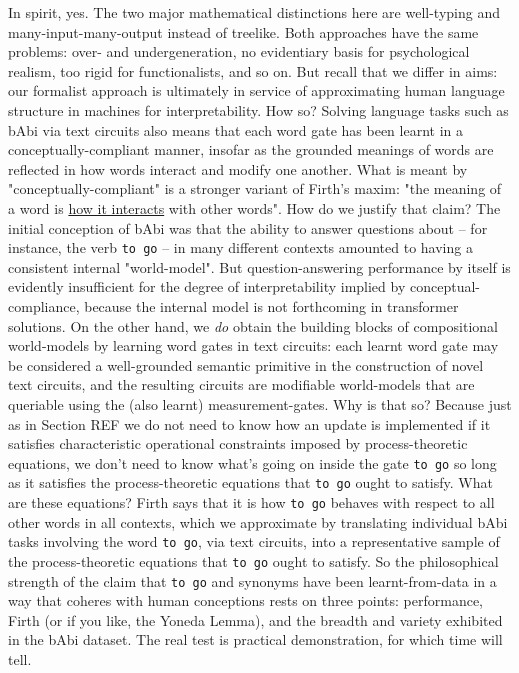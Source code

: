  In spirit, yes. The two major mathematical distinctions here are well-typing and many-input-many-output instead of treelike. Both approaches have the same problems: over- and undergeneration, no evidentiary basis for psychological realism, too rigid for functionalists, and so on. But recall that we differ in aims: our formalist approach is ultimately in service of approximating human language structure in machines for interpretability. How so? Solving language tasks such as bAbi via text circuits also means that each word gate has been learnt in a conceptually-compliant manner, insofar as the grounded meanings of words are reflected in how words interact and modify one another. What is meant by "conceptually-compliant" is a stronger variant of Firth's maxim: "the meaning of a word is \underline{how it interacts} with other words". How do we justify that claim? The initial conception of bAbi was that the ability to answer questions about -- for instance, the verb \texttt{to go} -- in many different contexts amounted to having a consistent internal "world-model". But question-answering performance by itself is evidently insufficient for the degree of interpretability implied by conceptual-compliance, because the internal model is not forthcoming in transformer solutions. On the other hand, we \emph{do} obtain the building blocks of compositional world-models by learning word gates in text circuits: each learnt word gate may be considered a well-grounded semantic primitive in the construction of novel text circuits, and the resulting circuits are modifiable world-models that are queriable using the (also learnt) measurement-gates. Why is that so? Because just as in Section \bR REF \e we do not need to know how an update is implemented if it satisfies characteristic operational constraints imposed by process-theoretic equations, we don't need to know what's going on inside the gate \texttt{to go} so long as it satisfies the process-theoretic equations that \texttt{to go} ought to satisfy. What are these equations? Firth says that it is how \texttt{to go} behaves with respect to all other words in all contexts, which we approximate by translating individual bAbi tasks involving the word \texttt{to go}, via text circuits, into a representative sample of the process-theoretic equations that \texttt{to go} ought to satisfy. So the philosophical strength of the claim that \texttt{to go} and synonyms have been learnt-from-data in a way that coheres with human conceptions rests on three points: performance, Firth (or if you like, the Yoneda Lemma), and the breadth and variety exhibited in the bAbi dataset. The real test is practical demonstration, for which time will tell.

